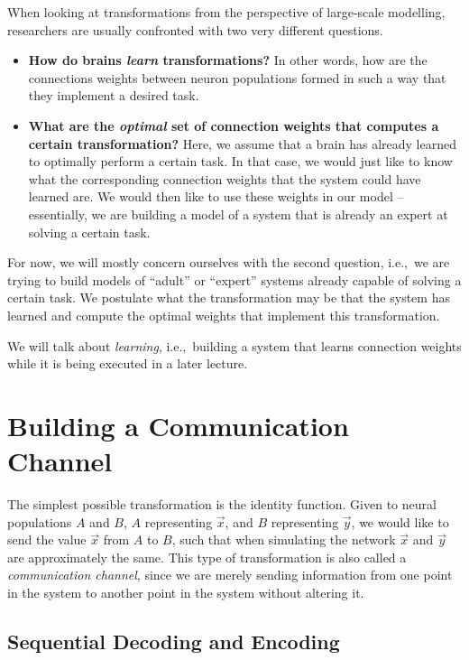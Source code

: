\documentclass[10pt,letterpaper,oneside]{article}
\begin{document}
When looking at transformations from the perspective of large-scale modelling, researchers are usually confronted with two very different questions.
\begin{itemize}
	\item \textbf{How do brains \emph{learn} transformations?}
	In other words, how are the connections weights between neuron populations formed in such a way that they implement a desired task.
	\item \textbf{What are the \emph{optimal} set of connection weights that computes a certain transformation?}
	Here, we assume that a brain has already learned to optimally perform a certain task. In that case, we would just like to know what the corresponding connection weights that the system could have learned are. We would then like to use these weights in our model -- essentially, we are building a model of a system that is already an expert at solving a certain task.
\end{itemize}
For now, we will mostly concern ourselves with the second question, i.e.,~we are trying to build models of \enquote{adult} or \enquote{expert} systems already capable of solving a certain task. We postulate what the transformation may be that the system has learned and compute the optimal weights that implement this transformation.

We will talk about \emph{learning}, i.e.,~building a system that learns connection weights while it is being executed in a later lecture.

\section{Building a Communication Channel}

The simplest possible transformation is the identity function. Given to neural populations $A$ and $B$, $A$ representing $\vec x$, and $B$ representing $\vec y$, we would like to send the value $\vec x$ from $A$ to $B$, such that when simulating the network $\vec x$ and $\vec y$ are approximately the same. This type of transformation is also called a \emph{communication channel}, since we are merely sending information from one point in the system to another point in the system without altering it.

\subsection{Sequential Decoding and Encoding}
\end{document}
